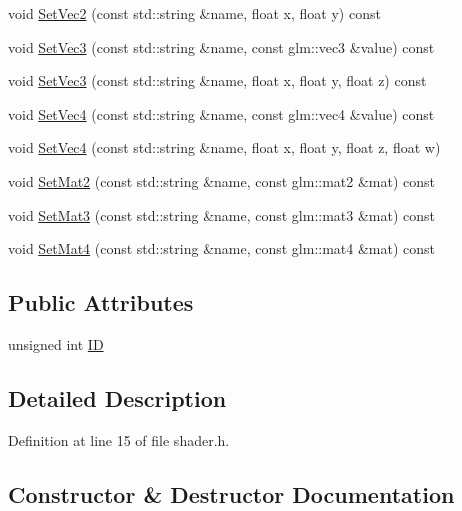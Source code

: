 \begin{DoxyCompactItemize}
\item 
void \mbox{\hyperlink{class_shader_a7152c472e8d452a91789244726aacbaf}{Set\+Vec2}} (const std\+::string \&name, float x, float y) const
\item 
void \mbox{\hyperlink{class_shader_a8d1456b390875e5a99e70a658a4dfdd3}{Set\+Vec3}} (const std\+::string \&name, const glm\+::vec3 \&value) const
\item 
void \mbox{\hyperlink{class_shader_a685cbffc1eec6ae40fe103a8fcc2aaaf}{Set\+Vec3}} (const std\+::string \&name, float x, float y, float z) const
\item 
void \mbox{\hyperlink{class_shader_a12c2843859a8c0f26d8342ef17b4355c}{Set\+Vec4}} (const std\+::string \&name, const glm\+::vec4 \&value) const
\item 
void \mbox{\hyperlink{class_shader_aa22b708c2c588f8064a7dc729dccd4ac}{Set\+Vec4}} (const std\+::string \&name, float x, float y, float z, float w)
\item 
void \mbox{\hyperlink{class_shader_ac345337847ed1014b53f5fa8f0d36f92}{Set\+Mat2}} (const std\+::string \&name, const glm\+::mat2 \&mat) const
\item 
void \mbox{\hyperlink{class_shader_a2e0ffe4d09505df823e90469c630a411}{Set\+Mat3}} (const std\+::string \&name, const glm\+::mat3 \&mat) const
\item 
void \mbox{\hyperlink{class_shader_a073aaba20478e601d18d761ef187d9aa}{Set\+Mat4}} (const std\+::string \&name, const glm\+::mat4 \&mat) const
\end{DoxyCompactItemize}
\subsection*{Public Attributes}
\begin{DoxyCompactItemize}
\item 
unsigned int \mbox{\hyperlink{class_shader_a142a08b6fbdfc982d82ca10ee0b0f38d}{ID}}
\end{DoxyCompactItemize}


\subsection{Detailed Description}


Definition at line 15 of file shader.\+h.



\subsection{Constructor \& Destructor Documentation}
\mbox{\label{class_shader_a0d654ebaca4e0555197c0724c6d30610}} 
